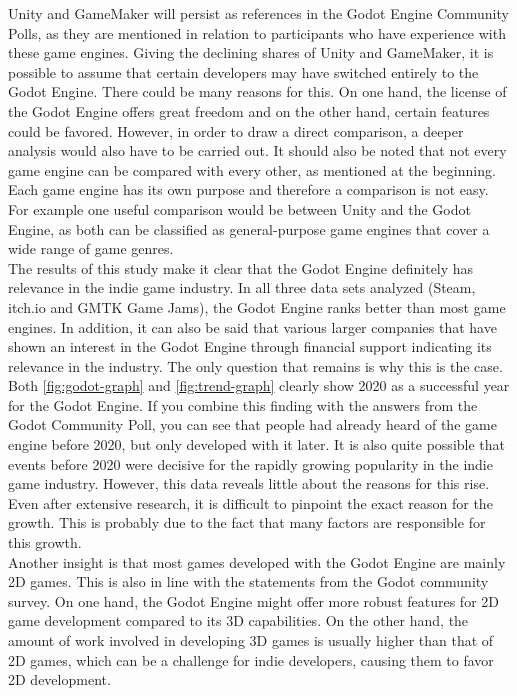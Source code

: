 Unity and GameMaker will persist as references in the Godot Engine Community Polls, as they are mentioned in relation to participants who have experience with these game engines.
Giving the declining shares of Unity and GameMaker, it is possible to assume that certain developers may have switched entirely to the Godot Engine.
There could be many reasons for this.
On one hand, the license of the Godot Engine offers great freedom and on the other hand, certain features could be favored.
However, in order to draw a direct comparison, a deeper analysis would also have to be carried out.
It should also be noted that not every game engine can be compared with every other, as mentioned at the beginning.
Each game engine has its own purpose and therefore a comparison is not easy.
For example one useful comparison would be between Unity and the Godot Engine, as both can be classified as general-purpose game engines that cover a wide range of game genres.\\

The results of this study make it clear that the Godot Engine definitely has relevance in the indie game industry.
In all three data sets analyzed (Steam, itch.io and GMTK Game Jams), the Godot Engine ranks better than most game engines.
In addition, it can also be said that various larger companies that have shown an interest in the Godot Engine through financial support indicating its relevance in the industry. 
The only question that remains is why this is the case.
Both \autoref{fig:godot-graph} and \autoref{fig:trend-graph} clearly show 2020 as a successful year for the Godot Engine.
If you combine this finding with the answers from the Godot Community Poll, you can see that people had already heard of the game engine before 2020, but only developed with it later.
It is also quite possible that events before 2020 were decisive for the rapidly growing popularity in the indie game industry.
However, this data reveals little about the reasons for this rise. Even after extensive research, it is difficult to pinpoint the exact reason for the growth.
This is probably due to the fact that many factors are responsible for this growth. \\

Another insight is that most games developed with the Godot Engine are mainly 2D games.
This is also in line with the statements from the Godot community survey.
On one hand, the Godot Engine might offer more robust features for 2D game development compared to its 3D capabilities.
On the other hand, the amount of work involved in developing 3D games is usually higher than that of 2D games, which can be a challenge for indie developers, causing them to favor 2D development. \\

